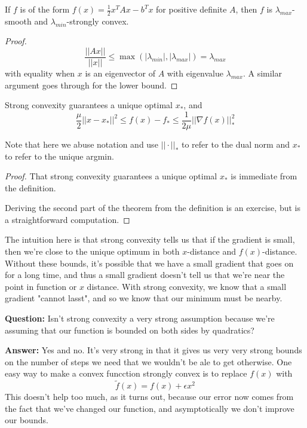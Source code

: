 \begin{proposition}
    If $f$ is of the form $f(x) = \frac{1}{2}x^TAx - b^Tx$ for positive definite $A$, then $f$ is $\lambda_{max}$-smooth and $\lambda_{min}$-strongly convex. 
\end{proposition}

\begin{proof}
   $$\frac{||Ax||}{||x||} \leq \max(|\lambda_{min}|, |\lambda_{max}|) = \lambda_{max}$$ with equality when $x$ is an eigenvector of $A$ with eigenvalue $\lambda_{max}$. A similar argument goes through for the lower bound. 
\end{proof}

\begin{theorem}
    Strong convexity guarantees a unique optimal $x_*$, and 
    $$\frac{\mu}{2}||x-x_*||^2 \leq f(x) - f_* \leq \frac{1}{2\mu}||\nabla f(x)||_*^2$$
\end{theorem}

Note that here we abuse notation and use $||\cdot||_*$ to refer to the dual norm and $x_*$ to refer to the unique argmin. 

\begin{proof}
    That strong convexity guarantees a unique optimal $x_*$ is immediate from the definition. 

    Deriving the second part of the theorem from the definition is an exercise, but is a straightforward computation. 
\end{proof}

The intuition here is that strong convexity tells us that if the gradient is small, then we're close to the unique optimum in both $x$-distance and $f(x)$-distance. Without these bounds, it's possible that we have a small gradient that goes on for a long time, and thus a small gradient doesn't tell us that we're near the point in function or $x$ distance. With strong convexity, we know that a small gradient "cannot lasst", and so we know that our minimum must be nearby. 


\begin{remark}
    \textbf{Question: } Isn't strong convexity a very strong assumption because we're assuming that our function is bounded on both sides by quadratics?
  
  
    \textbf{Answer: } Yes and no. It's very strong in that it gives us very very strong bounds on the number of steps we need that we wouldn't be ale to get otherwise. One easy way to make a convex funcction strongly convex is to replace $f(x)$ with $$\tilde{f}(x) = f(x) + \epsilon x^2$$ This doesn't help too much, as it turns out, because our error now comes from the fact that we've changed our function, and asymptotically we don't improve our bounds. 
\end{remark}


